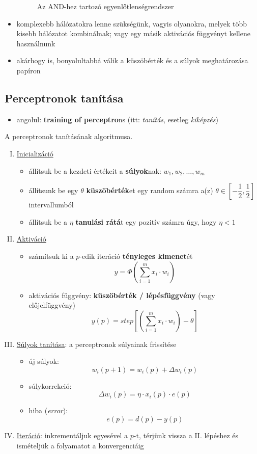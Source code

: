 \documentclass[a4paper, 11pt]{article}
\begin{document}
\begin{itemize}
\begin{figure}[h!]
		\caption{Az AND-hez tartozó egyenlőtlenségrendszer}
	\end{figure}
	\item komplexebb hálózatokra lenne szükségünk, vagyis olyanokra, melyek több kisebb hálózatot kombinálnak; vagy egy másik aktivációs függvényt kellene használnunk
	\item akárhogy is, bonyolultabbá válik a küszöbérték és a súlyok meghatározása papíron
\end{itemize}

\subsection{Perceptronok tanítása}

\begin{itemize}
	\item angolul: \textbf{training of perceptro}ns (itt: \textit{tanítás}, esetleg \textit{kiképzés})
\end{itemize}

A perceptronok tanításának algoritmusa.

\begin{enumerate}[I.)]
	\item \underline{Inicializáció}
	\begin{itemize}
		\item állítsuk be a kezdeti értékeit a \textbf{súlyok}nak: $w_1, w_2, \dots, w_m$
		\item állítsunk be egy $\theta$ \textbf{küszöbérték}et egy random számra a(z) $\theta \in \left[ - \dfrac{1}{2}, \dfrac{1}{2} \right]$ intervallumból
		\item állítsuk be a $\eta$ \textbf{tanulási rátá}t egy pozitív számra úgy, hogy $\eta < 1$
	\end{itemize}
	\item \underline{Aktiváció}
	\begin{itemize}
		\item számítsuk ki a $p$-edik iteráció \textbf{tényleges kimenet}ét
		\[ y = \Phi \left( \sum\limits_{i = 1}^{m} x_i \cdot w_i \right) \]
		\item aktivációs függvény: \textbf{küszöbérték / lépésfüggvény} (vagy előjelfüggvény)
		\[ y(p) = step \left[ \left( \sum\limits_{i = 1}^{m} x_i \cdot w_i \right) - \theta \right] \]
	\end{itemize}
	\item \underline{Súlyok tanítása}: a perceptronok súlyainak frissítése
	\begin{itemize}
		\item új súlyok: \[ w_i(p+1) = w_i(p) + \Delta w_i(p) \]
		\item súlykorrekció: \[ \Delta w_i(p) = \eta \cdot x_i(p) \cdot e(p) \]
		\item hiba (\textit{error}): \[ e(p) = d(p) - y(p) \]
	\end{itemize}
	\item \underline{Iteráció}: inkrementáljuk egyesével a $p$-t, térjünk vissza a II. lépéshez és ismételjük a folyamatot a konvergenciáig
\end{enumerate}
\end{document}
